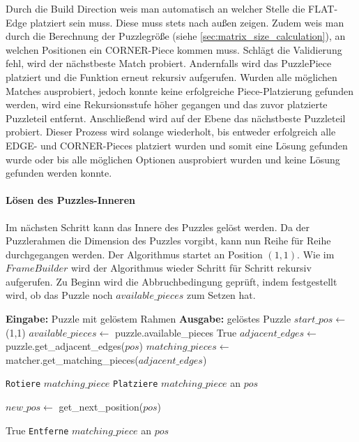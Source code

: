 Durch die Build Direction weis man automatisch an welcher Stelle die FLAT-Edge platziert sein muss. Diese muss stets nach außen zeigen. Zudem weis man durch die Berechnung der Puzzlegröße (siehe \autoref{sec:matrix_size_calculation}), an welchen Positionen ein CORNER-Piece kommen muss. Schlägt die Validierung fehl, wird der nächstbeste Match probiert. Andernfalls wird das PuzzlePiece platziert und die Funktion erneut rekursiv aufgerufen. 
Wurden alle möglichen Matches ausprobiert, jedoch konnte keine erfolgreiche Piece-Platzierung gefunden werden, wird eine Rekursionsstufe höher gegangen und das zuvor platzierte Puzzleteil entfernt. 
Anschließend wird auf der Ebene das nächstbeste Puzzleteil probiert. Dieser Prozess wird solange wiederholt, bis entweder erfolgreich alle EDGE- und CORNER-Pieces platziert wurden und somit eine Lösung gefunden wurde oder bis alle möglichen Optionen ausprobiert wurden und keine Lösung gefunden werden konnte.

\paragraph{Lösen des Puzzles-Inneren}

Im nächsten Schritt kann das Innere des Puzzles gelöst werden. Da der Puzzlerahmen die Dimension des Puzzles vorgibt, kann nun Reihe für Reihe durchgegangen werden. 
Der Algorithmus startet an Position $(1,1)$. Wie im $FrameBuilder$ wird der Algorithmus wieder Schritt für Schritt rekursiv aufgerufen. Zu Beginn wird die Abbruchbedingung geprüft, indem festgestellt wird, ob das Puzzle noch $available\_pieces$ zum Setzen hat.

\begin{algorithm}[H]
\caption{Depth-Search-Algorithmus}\label{alg:depth_search_algorithm}
\begin{algorithmic}[1]
\State \textbf{Eingabe:} Puzzle mit gelöstem Rahmen
\State \textbf{Ausgabe:} gelöstes Puzzle
\State $start\_pos \gets$ (1,1)
\State {}
\State {}
    \State $available\_pieces \gets$ puzzle.available\_pieces
     
        \State \Return True
    \EndIf
    \State $adjacent\_edges \gets$ puzzle.get\_adjacent\_edges($pos$)
    \State $matching\_pieces \gets$ matcher.get\_matching\_pieces($adjacent\_edges$)
    
        \State \texttt{Rotiere} $matching\_piece$
        \State \texttt{Platziere} $matching\_piece$ an $pos$
        
        \State $new\_pos \gets$ get\_next\_position($pos$) 

            \State \Return True
        \Else
            \State \texttt{Entferne} $matching\_piece$ an $pos$
        \EndIf      
    \EndFor
    
\EndFunction
\end{algorithmic}
\end{algorithm}

